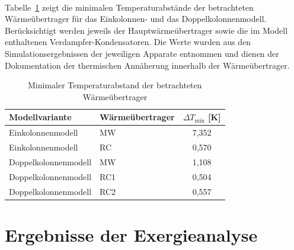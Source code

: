 \\
Tabelle~\ref{tab:min_temp_approach_waermeuebertrager} zeigt die minimalen Temperaturabstände der betrachteten Wärmeübertrager für das Einkolonnen- und das Doppelkolonnenmodell. Berücksichtigt werden jeweils der Hauptwärmeübertrager sowie die im Modell enthaltenen Verdampfer-Kondensatoren. Die Werte wurden aus den Simulationsergebnissen der jeweiligen Apparate entnommen und dienen der Dokumentation der thermischen Annäherung innerhalb der Wärmeübertrager.\\
\begin{table}[H]
\centering
\caption{Minimaler Temperaturabstand der betrachteten Wärmeübertrager}
\label{tab:min_temp_approach_waermeuebertrager}
\begin{tabular}{llc}
\toprule
\textbf{Modellvariante} & \textbf{Wärmeübertrager} & \textbf{$\Delta T_\mathrm{min}$ [K]} \\
\midrule
Einkolonnenmodell      & MW  & 7{,}352 \\
Einkolonnenmodell      & RC  & 0{,}570 \\
Doppelkolonnenmodell   & MW  & 1{,}108 \\
Doppelkolonnenmodell   & RC1 & 0{,}504 \\
Doppelkolonnenmodell   & RC2 & 0{,}557 \\
\bottomrule
\end{tabular}
\end{table}

\section{Ergebnisse der Exergieanalyse}
\label{sec:ergebnisse_exergie}

